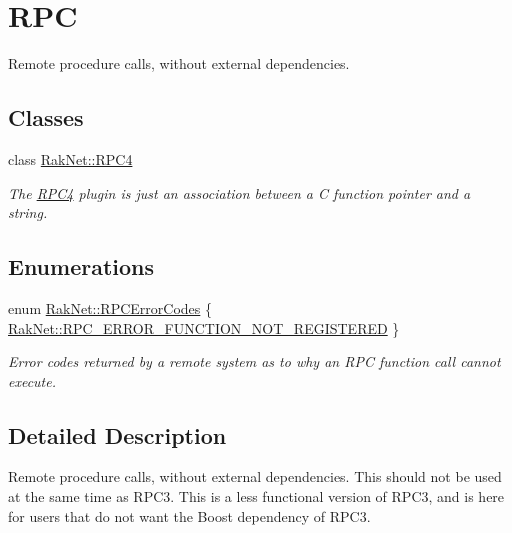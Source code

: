 \hypertarget{group___r_p_c___p_l_u_g_i_n___g_r_o_u_p}{\section{R\-P\-C}
\label{group___r_p_c___p_l_u_g_i_n___g_r_o_u_p}
}


Remote procedure calls, without external dependencies.  


\subsection*{Classes}
\begin{DoxyCompactItemize}
\item 
class \hyperlink{class_rak_net_1_1_r_p_c4}{Rak\-Net\-::\-R\-P\-C4}
\begin{DoxyCompactList}\small\item\em The \hyperlink{class_rak_net_1_1_r_p_c4}{R\-P\-C4} plugin is just an association between a C function pointer and a string. \end{DoxyCompactList}\end{DoxyCompactItemize}
\subsection*{Enumerations}
\begin{DoxyCompactItemize}
\item 
enum \hyperlink{group___r_p_c___p_l_u_g_i_n___g_r_o_u_p_gac20c52e6dc585406689d52db29925bba}{Rak\-Net\-::\-R\-P\-C\-Error\-Codes} \{ \hyperlink{group___r_p_c___p_l_u_g_i_n___g_r_o_u_p_ggac20c52e6dc585406689d52db29925bbaa832e0495ea50b9a373d201a3e28f086b}{Rak\-Net\-::\-R\-P\-C\-\_\-\-E\-R\-R\-O\-R\-\_\-\-F\-U\-N\-C\-T\-I\-O\-N\-\_\-\-N\-O\-T\-\_\-\-R\-E\-G\-I\-S\-T\-E\-R\-E\-D}
 \}
\begin{DoxyCompactList}\small\item\em Error codes returned by a remote system as to why an R\-P\-C function call cannot execute. \end{DoxyCompactList}\end{DoxyCompactItemize}


\subsection{Detailed Description}
Remote procedure calls, without external dependencies. This should not be used at the same time as R\-P\-C3. This is a less functional version of R\-P\-C3, and is here for users that do not want the Boost dependency of R\-P\-C3. 

